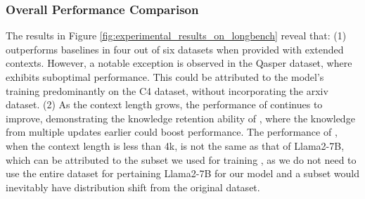 \subsubsection{Overall Performance Comparison}
The results in Figure \ref{fig:experimental_results_on_longbench} reveal that: 
(1) \ours outperforms baselines in four out of six datasets when provided with extended contexts. However, a notable exception is observed in the Qasper dataset, where \ours exhibits suboptimal performance. This could be attributed to the model's training predominantly on the C4 dataset, without incorporating the arxiv dataset.  
(2) As the context length grows, the performance of \ours continues to improve, demonstrating the knowledge retention ability of \ours, where the knowledge from multiple updates earlier could boost performance. 
The performance of \ours, when the context length is less than 4k, is not the same as that of Llama2-7B, which can be attributed to the subset we used for training \ours, as we do not need to use the entire dataset for pertaining Llama2-7B for our model and a subset would inevitably have distribution shift from the original dataset. 



